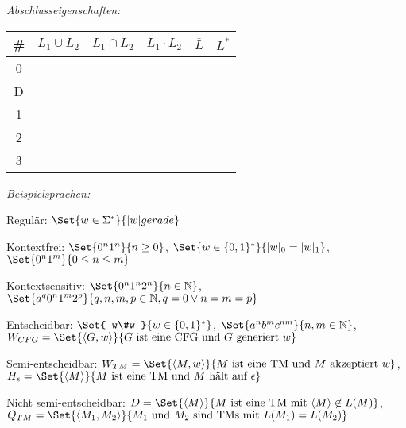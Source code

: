 \documentclass{cheat-sheet}
\newcommand{\cmark}{\ding{51}}
\newcommand{\xmark}{\ding{55}}
\begin{document}
\emph{Abschlusseigenschaften:}

\begin{center}
  \begin{tabular}{ c | c | c | c | c | c }
    \# & $L_{1} \cup L_{2}$ & $L_{1} \cap L_{2}$ & $L_{1} \cdot L_{2}$ & $\overline{L}$ & $L^{*}$ \\
    \hline
    0 & \cmark & \cmark & \cmark & \xmark & \cmark \\
    D & \cmark & \cmark & \cmark & \cmark & \cmark \\
    1 & \cmark & \cmark & \cmark & \cmark & \cmark \\
    2 & \cmark & \xmark & \cmark & \xmark & \cmark \\
    3 & \cmark & \cmark & \cmark & \cmark & \cmark
  \end{tabular}
\end{center}


\emph{Beispielsprachen:}

Regulär: $\Set{ w \in \Sigma^{*} }{ |w| gerade }$

Kontextfrei:
$\Set{0^{n}1^{n}}{n \ge 0}$,
$\Set{w \in \{ 0, 1 \}^{*}}{|w|_{0} = |w|_{1}}$,
$\Set{0^{n}1^{m}}{0 \le n \le m}$

Kontextsensitiv:
$\Set{0^{n}1^{n}2^{n}}{n \in \mathbb{N}}$,
$\Set{a^{q}0^{n}1^{m}2^{p}}{q, n, m, p \in \mathbb{N}, q = 0 \vee n = m = p}$

Entscheidbar:
$\Set{ w\#w }{w \in \{ 0, 1 \}^{*}}$,
$\Set{a^{n}b^{m}c^{nm}}{n, m \in \mathbb{N}}$,
$W_{CFG} = \Set{ \langle G, w \rangle }{ G \text{ ist eine CFG und } G \text{ generiert } w }$

Semi-entscheidbar:
$W_{TM} = \Set{ \langle M, w \rangle }{M \text{ ist eine TM und } M \text{ akzeptiert } w}$,
$H_{\epsilon} = \Set{ \langle M \rangle }{ M \text{ ist eine TM und } M \text{ hält auf } \epsilon }$

Nicht semi-entscheidbar:
$D = \Set{ \langle M \rangle }{ M \text{ ist eine TM mit } \langle M \rangle \not\in L(M) }$,
$Q_{TM} = \Set{ \langle M_{1}, M_{2} \rangle }{ M_{1} \text{ und } M_{2} \text{ sind TMs mit } L(M_{1}) = L(M_{2}) }$
\end{document}
